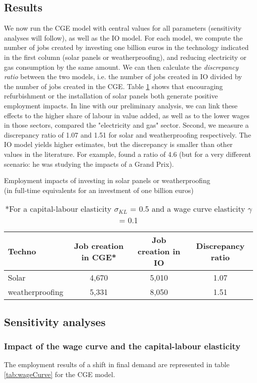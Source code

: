 \subsection{Results}
We now run the CGE model with central values for all parameters (sensitivity analyses will follow), as well as the IO model. 
For each model, we compute the number of jobs created by investing one billion euros in the technology indicated in the first column (solar panels or weatherproofing), and reducing electricity or gas consumption by the same amount.
We can then calculate the \textit{discrepancy ratio} between the two models, i.e. the number of jobs created in IO divided by the number of jobs created in the CGE.
Table \ref{tab:results} shows that encouraging refurbishment or the installation of solar panels both generate positive employment impacts.
In line with our preliminary analysis, we can link these effects to the higher share of labour in value added, as well as to the lower wages in those sectors, compared the "electricity and gas" sector.
Second, we measure a discrepancy ratio of 1.07 and 1.51 for solar and weatherproofing respectively. The IO model yields higher estimates, but the discrepancy is smaller than other values in the literature. For example, \citet{Dwyer2005} found a ratio of 4.6 (but for a very different scenario: he was studying the impacts of a Grand Prix).

\begin{table}[!h]
	\centering
	\caption{Employment impacts of investing in solar panels or weatherproofing \\ (in full-time equivalents for an investment of one billion euros)}
	\label{tab:results}
	\begin{tabular}{lccc}
		\toprule
		Techno & Job creation in CGE* & Job creation in IO & Discrepancy ratio \\
		\midrule
		Solar & 4,670 & 5,010 & 1.07 \\
		weatherproofing & 5,331 & 8,050 & 1.51 \\
		\bottomrule
	\end{tabular}
	\caption*{*For a capital-labour elasticity $\sigma_{KL}$ = 0.5 and a wage curve elasticity $\gamma$ = 0.1}
\end{table}


\subsection{Sensitivity analyses}

\subsubsection{Impact of the wage curve and the capital-labour elasticity}
The employment results of a shift in final demand are represented in table \ref{tab:wageCurve} for the CGE model.

